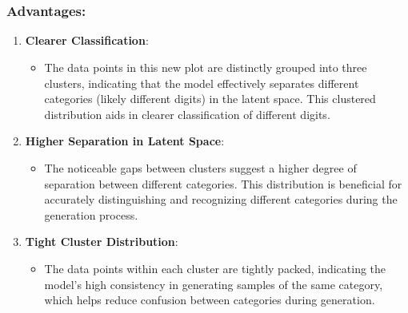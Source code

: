 \documentclass[11pt]{article}
\providecommand{\tightlist}{%
      \setlength{\itemsep}{0pt}\setlength{\parskip}{0pt}}
\begin{document}
    \begin{center}
    \end{center}
    { \hspace*{\fill} \\}
    
    \begin{center}
    \end{center}
    { \hspace*{\fill} \\}
    
    \subsubsection{Advantages:}\label{advantages}

\begin{enumerate}
\def\labelenumi{\arabic{enumi}.}
\tightlist
\item
  \textbf{Clearer Classification}:

  \begin{itemize}
  \tightlist
  \item
    The data points in this new plot are distinctly grouped into three
    clusters, indicating that the model effectively separates different
    categories (likely different digits) in the latent space. This
    clustered distribution aids in clearer classification of different
    digits.
  \end{itemize}
\item
  \textbf{Higher Separation in Latent Space}:

  \begin{itemize}
  \tightlist
  \item
    The noticeable gaps between clusters suggest a higher degree of
    separation between different categories. This distribution is
    beneficial for accurately distinguishing and recognizing different
    categories during the generation process.
  \end{itemize}
\item
  \textbf{Tight Cluster Distribution}:

  \begin{itemize}
  \tightlist
  \item
    The data points within each cluster are tightly packed, indicating
    the model's high consistency in generating samples of the same
    category, which helps reduce confusion between categories during
    generation.
  \end{itemize}
\end{enumerate}
\end{document}
